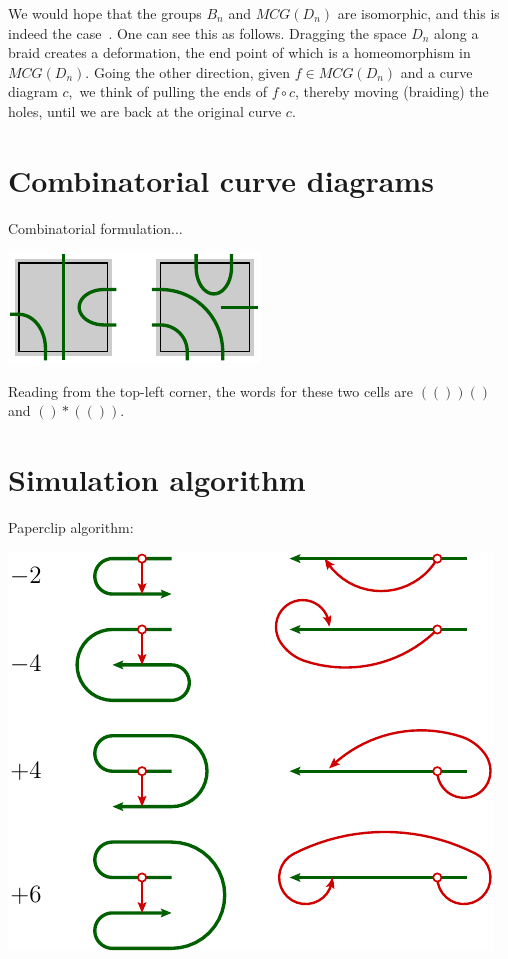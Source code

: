 \documentclass[aps, prl, letterpaper, twocolumn, superscriptaddress, notitlepage, 10pt]{revtex4-1}
\begin{document}
We would hope that the groups $B_n$ and $MCG(D_n)$ are
isomorphic, and this is indeed the case~\cite{Kassel2010}.
One can see this as follows. Dragging the space $D_n$ along
a braid creates a deformation, the end point of which is a
homeomorphism in $MCG(D_n).$ Going the other direction,
given $f\in MCG(D_n)$ and a curve diagram $c,$ we think of
pulling the ends of $f\circ c$, thereby moving (braiding) the holes,
until we are back at the original curve $c.$

\section{Combinatorial curve diagrams}

Combinatorial formulation... \cite{Abramsky2007}
\begin{center}
\includegraphics[]{pic-cells.pdf}
\end{center}
Reading from the top-left corner, the words for these
two cells are $(())()$ and $()*(()).$

\section{Simulation algorithm}

Paperclip algorithm:
\begin{center}
\includegraphics[]{pic-paperclip.pdf}
\end{center}
\end{document}
